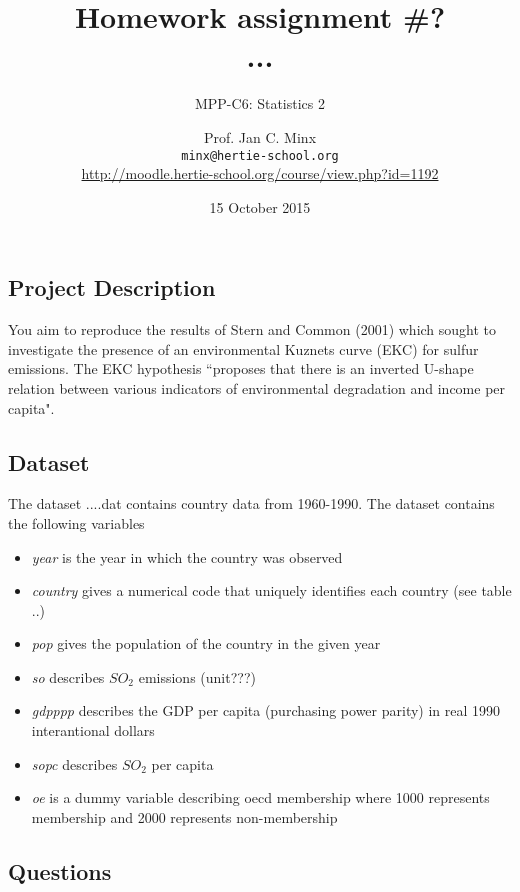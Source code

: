 \documentclass{scrartcl}
\begin{document}
	\title{Homework assignment \#?\\ ...}
	\subtitle{MPP-C6: Statistics 2}
	\author{Prof. Jan C. Minx\\ \texttt{minx@hertie-school.org} \\
		\url{http://moodle.hertie-school.org/course/view.php?id=1192}}
	\date{15 October 2015}
	
	\maketitle

	\subsection*{Project Description}
	You aim to reproduce the results of Stern and Common (2001) which sought to investigate the presence of an environmental Kuznets curve (EKC) for sulfur emissions. The EKC hypothesis ``proposes that there is an inverted U-shape relation between various indicators of environmental degradation and income per capita"\cite{stern2001there}.
	
	\subsection*{Dataset}
	The dataset ....dat contains country data from 1960-1990. The dataset contains the following variables
	\begin{itemize}
	\item \textit{year} is the year in which the country was observed 
	\item \textit{country} gives a numerical code that uniquely identifies each country (see table ..)
	\item \textit{pop} gives the population of the country in the given year
	\item \textit{so} describes \(SO_2\) emissions (unit???)
	\item \textit{gdpppp} describes the GDP per capita (purchasing power parity) in real 1990 interantional dollars
	\item \textit{sopc} describes \(SO_2\) per capita
	\item \textit{oe} is a dummy variable describing oecd membership where 1000 represents membership and 2000 represents non-membership
	\end{itemize}
	
	\subsection*{Questions}
	
\end{document}
